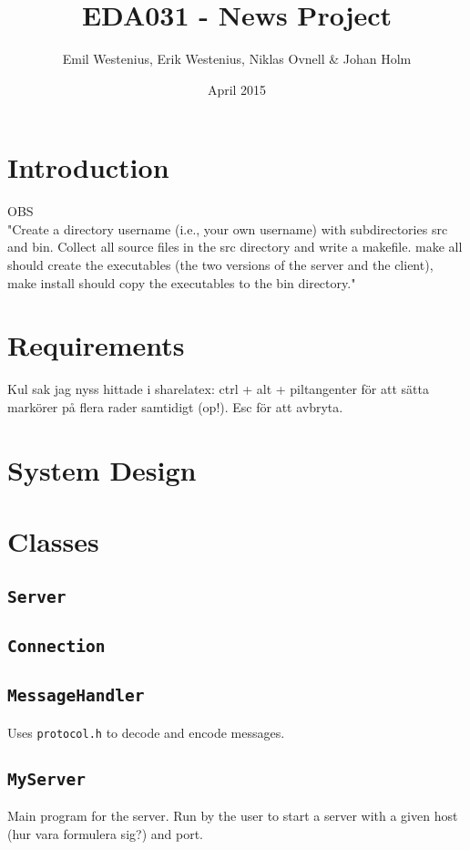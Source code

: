 \documentclass{article}
\title{EDA031 - News Project}
\author{Emil Westenius, Erik Westenius, Niklas Ovnell \& Johan Holm }
\date{April 2015}
\begin{document}
\maketitle
\pagebreak
\section{Introduction}
OBS\hfill\\
"Create a directory username (i.e., your own username) with subdirectories src and bin.
Collect all source files in the src directory and write a makefile. make all should create the
executables (the two versions of the server and the client), make install should copy the
executables to the bin directory."

\section{Requirements}
Kul sak jag nyss hittade i sharelatex: ctrl + alt + piltangenter för att sätta markörer på flera rader samtidigt (op!). Esc för att avbryta.
\section{System Design}

\section{Classes}
\subsection{\texttt{Server}}

\subsection{\texttt{Connection}}

\subsection{\texttt{MessageHandler}}
Uses \texttt{protocol.h} to decode and encode messages.

\subsection{\texttt{MyServer}}
Main program for the server. Run by the user to start a server with a given host (hur vara formulera sig?) and port.
\end{document}
